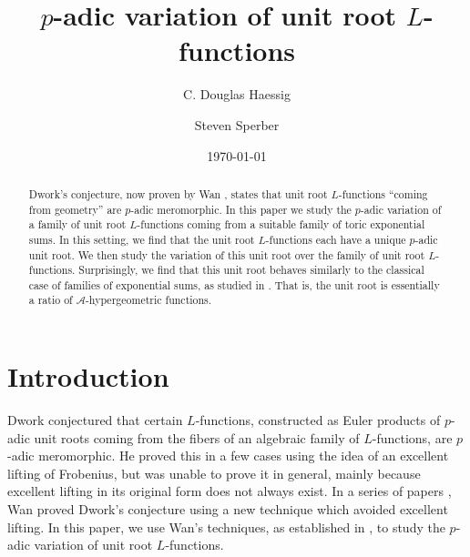 \documentclass{article}
\theoremstyle{remark}
\def\c #1{ {\mathcal #1} }
\begin{document}
\title{$p$-adic variation of unit root $L$-functions}

\author{C. Douglas Haessig \and Steven Sperber}

\date{\today}
\maketitle

\begin{abstract}
Dwork's conjecture, now proven by Wan \cite{Wan-Higherrankcase-2000, Wan-Rankonecase-2000, Wan-DworkConjectureunit-1999}, states that unit root $L$-functions ``coming from geometry'' are $p$-adic meromorphic. In this paper we study the $p$-adic variation of a family of unit root $L$-functions coming from a suitable family of toric exponential sums. In this setting, we find that the unit root $L$-functions each have a unique $p$-adic unit root. We then study the variation of this unit root over the family of unit root $L$-functions. Surprisingly, we find that this unit root behaves similarly to the classical case of families of exponential sums, as studied in \cite{MR2966711}. That is, the unit root is essentially a ratio of $\c A$-hypergeometric functions.
\end{abstract}



\section{Introduction}

Dwork conjectured \cite{Dwork-NormalizedPeriodsII} that certain $L$-functions, constructed as Euler products of $p$-adic unit roots coming from  the fibers of an algebraic family of $L$-functions, are $p$-adic meromorphic. He proved this in a few cases using the idea of an excellent lifting of Frobenius, but was unable to prove it in general, mainly because excellent lifting in its original form does not always exist. In a series of papers \cite{Wan-Higherrankcase-2000, Wan-Rankonecase-2000, Wan-DworkConjectureunit-1999}, Wan proved Dwork's conjecture using a new technique which avoided excellent lifting. In this paper, we use Wan's techniques, as established in \cite{MR3249829}, to study the $p$-adic variation of unit root $L$-functions.
\end{document}
